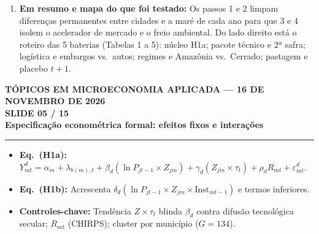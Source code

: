 \documentclass[11pt,a4paper]{article}
\newcommand{\slidenum}{1}
\begin{document}
{\begin{enumerate}[leftmargin=*,label=\textbf{(\arabic*)},itemsep=1.2mm,topsep=1mm]
    \item \textbf{Em resumo e mapa do que foi testado:} Os passos 1 e 2 limpam diferenças permanentes entre cidades e a maré de cada ano para que 3 e 4 isolem o acelerador de mercado e o freio ambiental. Do lado direito está o roteiro das 5 baterias (Tabelas 1 a 5): núcleo H1a; pacote técnico e 2ª safra; logística e embargos vs.\ autos; regimes e Amazônia vs.\ Cerrado; pastagem e placebo $t+1$.
\end{enumerate}
}

\newpage

\renewcommand{\slidenum}{5}
\noindent
\begin{minipage}{\textwidth}
\begin{center}
{\color{cinza}\footnotesize\textbf{TÓPICOS EM MICROECONOMIA APLICADA --- 16 DE NOVEMBRO DE 2026}\\[1.2mm]}
{\color{cinza}\bfseries\Large SLIDE 05 / 15\\[1.5mm]}
{\color{verde}\bfseries\LARGE Especificação econométrica formal: efeitos fixos e interações\\[2.5mm]}
\rule{\textwidth}{1pt}
\end{center}
\end{minipage}
\vspace{1.5mm}

\begin{tcolorbox}[title={\bfseries\small ÂNCORAS EMPÍRICAS E CONCEITUAIS DO SLIDE}]
\begin{itemize}[leftmargin=*,itemsep=1mm,topsep=0.5mm]
    \item \textbf{Eq.\ (H1a):} $Y_{mt}^d = \alpha_m + \lambda_{b(m),t} + \beta_d(\ln P_{jt-1} \times Z_{jm}) + \gamma_d(Z_{jm} \times \tau_t) + \rho_d R_{mt} + \varepsilon_{mt}^d$.
    \item \textbf{Eq.\ (H1b):} Acrescenta $\delta_d(\ln P_{jt-1} \times Z_{jm} \times \text{Inst}_{mt-1})$ e termos inferiores.
    \item \textbf{Controles-chave:} Tendência $Z \times \tau_t$ blinda $\beta_d$ contra difusão tecnológica secular; $R_{mt}$ (CHIRPS); cluster por município ($G=134$).
\end{itemize}
\end{tcolorbox}
\vspace{2mm}
\end{document}
